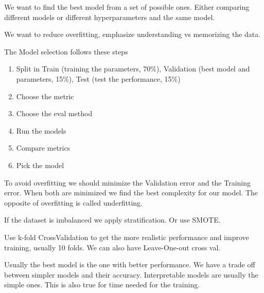 \vspace{10pt}

We want to find the best model from a set of possible ones. Either comparing different models or different hyperparameters and the same model.

\vspace{10pt}

We want to reduce overfitting, emphasize understanding vs memorizing the data.

\vspace{10pt}

The Model selection follows these steps

\begin{enumerate}
    \item Split in Train (training the parameters, 70\%), Validation (best model and parameters, 15\%), Test (test the performance, 15\%)

    \item Choose the metric

    \item Choose the eval method

    \item Run the models

    \item Compare metrics

    \item Pick the model
    
\end{enumerate}


\vspace{10pt}

To avoid overfitting we should minimize the Validation error and the Training error. When both are minimized we find the best complexity for our model. The opposite of overfitting is called underfitting.

\vspace{10pt}

If the dataset is imbalanced we apply stratification. Or use SMOTE.

\vspace{10pt}

Use k-fold CrossValidation to get the more realistic performance and improve training, usually 10 folds. We can also have Leave-One-out cross val.

\vspace{10pt}

Usually the best model is the one with better performance. We have a trade off between simpler models and their accuracy. Interpretable models are usually the simple ones. This is also true for time needed for the training.


